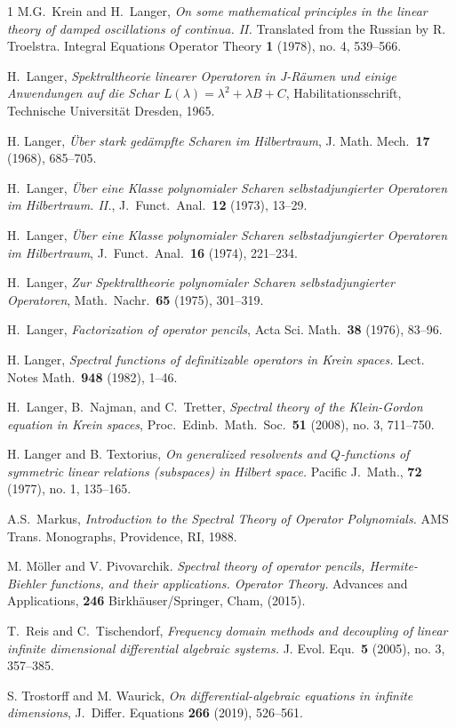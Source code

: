 \documentclass{birkjour}
\theoremstyle{definition}
\theoremstyle{remark}
\numberwithin{equation}{section}
\begin{document}
\begin{thebibliography}{1}
 M.G.\ Krein and H.\ Langer, \textit{On some mathematical principles in the linear theory of damped oscillations of continua. II.}  Translated from the Russian by R. Troelstra. Integral Equations Operator Theory \textbf{1} (1978), no. 4, 539--566.

 H.~Langer, 
\textit{Spektraltheorie linearer Operatoren in J-R\"{a}umen und 
einige Anwendungen auf die Schar $L(\lambda) = \lambda^2 + \lambda B + C$},
Habilitationsschrift, Technische Universit\"{a}t Dresden, 1965.

 H. Langer,
\textit{\"{U}ber stark ged\"{a}mpfte Scharen im Hilbertraum},
J. Math. Mech.\ \textbf{17} (1968), 685--705.

 H.\ Langer, \textit{\"{U}ber eine Klasse polynomialer Scharen selbstadjungierter Operatoren im Hilbertraum. II.},
J.\ Funct.\ Anal.\ \textbf{12} (1973), 13--29.

 H.\ Langer, 
\textit{\"{U}ber eine Klasse polynomialer Scharen selbstadjungierter Operatoren im Hilbertraum}, 
J.\ Funct.\ Anal.\ \textbf{16} (1974), 221--234.

 H.\ Langer,
\textit{Zur Spektraltheorie polynomialer Scharen selbstadjungierter Operatoren},
Math.\ Nachr.\ \textbf{65} (1975), 301--319.

 H.\ Langer, \textit{Factorization of operator pencils}, Acta Sci. Math.\ \textbf{38} (1976), 83--96.

 H. Langer,  \textit{Spectral functions of definitizable operators in Krein spaces.} Lect. Notes Math.\ \textbf{948} (1982), 1--46.

 H.\ Langer, B.\ Najman, and C.\ Tretter, \textit{Spectral theory of the Klein-Gordon equation in Krein spaces}, Proc.\ Edinb.\ Math.\ Soc.\ \textbf{51} (2008), no. 3, 711--750.

 H. Langer and B. Textorius, \textit{ On generalized resolvents and $Q$-functions of symmetric linear relations (subspaces) in Hilbert space.} Pacific J.\ Math., \textbf{72} (1977), no. 1, 135--165.


 A.S.\ Markus, \textit{Introduction to the Spectral Theory of Operator Polynomials.} AMS Trans. Monographs, Providence, RI, 1988.

M. Möller and V. Pivovarchik. \textit{Spectral theory of operator pencils, Hermite-Biehler functions, and their applications. Operator Theory.} Advances and Applications, \textbf{246} Birkhäuser/Springer, Cham, (2015).

 T.\ Reis and C.\ Tischendorf, \textit{Frequency domain methods and decoupling of linear infinite dimensional differential algebraic systems.} J. Evol. Equ.\ \textbf{5} (2005), no. 3, 357--385.

S. Trostorff and M. Waurick, \textit{On differential-algebraic equations in infinite dimensions}, J.\ Differ. Equations \textbf{266} (2019), 526--561.
\end{thebibliography}
\end{document}
